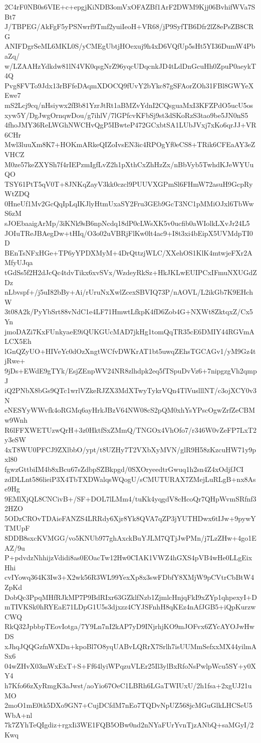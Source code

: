 2C4rF0NB0s6VIE+c+epgjKiNDB3omVxOFAZBf1ArF2DWM9Kjj06BvhifWVa7SBt7
J/TBPEG/AkFgF5yPSNwrf9Tmf2yuiIeoH+VR68/jP9SyfTB6Dfr2lZ8ePsZB8CRG
ANIFDgrSeML6MKL0S/yCMEgUbtjHOexuj9h4xD6VQfUp5sHt5YI36DumW4PbaZq/
w/LZAAHzYdkdw81lN4VK0qsgNrZ96yqcUDqcnkJD4tLdDnGcuHh0ZpuP0aeykT4Q
Pvg8FVTo9Jdx13rBFfeDAqmXDOCQ9fUvY2bYkc87gSFAorZOh31FBl8GWYeXEwe7
mS2Lcj9cq/nHsiywx2fBb81YzrJtRt1aBMZvYdnI2CQsguaMxI3KFZPdO5ucU5os
xyw5Y/DgJwgOrnqwDou/g7ihlV/7lGPfcvKFbSj9st3dSKoRzS3tao9be5JN0nS5
4fhoJMY36ReLWGhNWCHvQgP5IBwteP472GCxbtSA1LUbJVxj7xKo6qrJJ+VR6CHr
Mwl3luuXm8K7+HOKmARkeQIZoIvsEN3ic4RPOgYf0eCS8+TRik6CFEaAY3eZVHCZ
M0ze57keZXYSh7f4rIEPzmIgfLvZ2h1pXthCxZhHzZx/nBbVyb5TwhdKJeWYUuQO
TSY61PtT5qV0T+8JNKqZayV3kk0czcl9PUUVXGPmSl6FHmW72asuH9GcpRyWtZDQ
0HneUf1Mv2GcQqIpLqIKJlyHtmUxaSY2Fru3GEb9GcT3NC1pMMiOJxl6TbWwS6zM
sJOEbaaigArMp/3iKNk9sB6npNcdq18dP0cLWsXK5v0ucfib0aWIolkLXvJr24L5
JOIuTReJBAegDw+tHIq/O3o02uVBRjFlKw0lt4ac9+I8t3xi4bEipX5UVMdpTI0D
BEnTsNFxHGe+TP6yYPDXMyM+4DrQttzjWLC/XXehOS1KlK4mtwjeFXr2AMfyUJqa
tGdSs5f2H2dJcQc4tdvTikx6xvSVx/WzdeyRkSz+HkJKLwEUIPCxIFmuNXUGdZDz
nLbvspf+/j5uI82bBy+Ai/rUruNxXwlZcexSBVIQ73P/nAOVL/L2ikGb7K9EHchW
3t08A2k/PyYbSrt88vNdC1e4LF71HmwtLfkpK4fD6Zob4G+NXWt8ZktqxZ/Cx5Yn
jmoDAZi7KxFUnkyaeE9iQUKGUcMAD7jkHg1tomQqTR35cE6DMIY44RGVmALCX5Eh
lGnQZyUO+HIVeYc0dOzXngtWCfvDWKrAT1bt5uwqZEhsTGCAGv1/yM9Gz4tjRwe+
9jDs+EWdE9gTYk/EsjZEnpWV24NR8zlhdpk2eq5fTSpuDvVz6+7nipgzgVh2qmpJ
iQ2PNbX8bGs9QTc1wrlVZkeRJZX3MdXTwyTykrVQn4TlVuslllNT/c3ojXCY0v3N
eNESYyWWvfk4oRGMq6ayHrkJBzV64NW08cS2pQM0xhYsYPscOgwZrfZeCBMw9Wnh
R6lFFXWETUzwQrH+3z0HktfSxZMmQ/TNGOx4VhOfo7/r346W0vZeFP7LxT2y3eSW
4xT8WU0PFCJ9ZXlbbO/ypt/t8UZHy7T2VXbXyMVN/glR9H58zKzcuHW71y9pxl80
fgwzGttbiIM4b8xBcu67sZdbpSZBkpgd/0SXOryeedtrGwuq1h2sn4Z4xOdjfJCI
zdDLLnt586lieiP3X4TbTXDWalqsWQogU/sCMUTURAX7ZMejLuRLgB+nx8Ase9Hg
9EMlXjQL8CNCivB+/SF+DOL7lLMm4/tuKk4yqgdV8cHcoQr7QHpWvmSRfnf32HZO
5ODzCROvTDAieFANZS4LRRdy6Xjr8Yk8QVA7qZP3jYUTHDwx6tIJw+9pywYTMUpF
8DDB8sxcKVMGG/vo5KNUb977ghAxckBuYJLM7QTjJwPMn/j7LzZHw+4go1EAZ/9u
P+pdvdzNhhijzVdidi8as0EOacTw12Hw0CIAK1VWZ4hGXS4pVB4wHe0LLgEixHhi
cvIYowq364K3Iw3+X2wk56R3WL99YexXp8x3swFDbfY8XMjW9pCVtrCbBtW4ZpKd
DobQc3PpqMHfRJkMP7P9BdRIxr63GZklfNzb1ZjmlcHnjqFkI9xZYp1qhpexyI+D
mTIVKSk0hRYEaE71LDpG1U5s3djxzz4CYJSFnhH8qKEz4nAfJGB5+iQpKurzwCWQ
RkQ32JpbbpTEovIotga/7Y9Ln7nI2kAP7yD9INjrhjKO9mJOFvx6ZYcAYOJwHwDS
xJhqJQQGzfnWXDn+kpoBl7O8yqUABvLQRrX7Srlh7isUUMmSefxxMX44yilmASx6
04wZHvX03mWxExT+S+Ff64lyiWPqzuVLEr25Il3ylBxRfoNsPwlpWcu5SY+y0XY4
h7Kfo66zXyRmgK3aJwst/aoYio67OeC1LBRh6LGaTWIUxU/2h1fsa+2xgUJ21uMO
2moO1mE0tk5DXo9GN7+CujDCfdM7nEo7TQDvNpUZ568jcMGuGlkLHCSeU5WbA+nl
7k7ZYhTeQIgdiz+rgxIi3WE1FQB5OBw0nd2nNYaFUrYvnTjzANbQ+saMGyI/2Kwq
